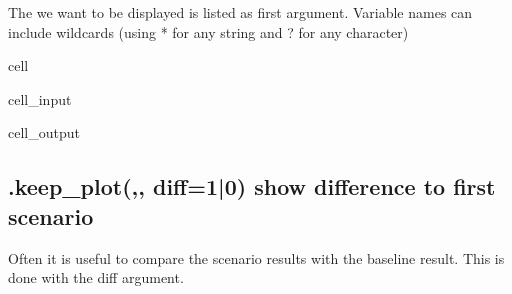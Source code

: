 \documentclass[letterpaper,10pt,english]{jupyterBook}
\begin{document}
\sphinxAtStartPar
The  we want to be displayed is listed as first argument. Variable names can include
wildcards (using * for any string and ? for any character)

\begin{sphinxuseclass}{cell}\begin{sphinxVerbatimInput}

\begin{sphinxuseclass}{cell_input}
\begin{sphinxVerbatim}[commandchars=\\\{\}]
   \PYG{p}{[}\PYG{p}{]}
       
\end{sphinxVerbatim}

\end{sphinxuseclass}\end{sphinxVerbatimInput}
\begin{sphinxVerbatimOutput}

\begin{sphinxuseclass}{cell_output}
\noindent{}

\noindent{}

\noindent{}

\end{sphinxuseclass}\end{sphinxVerbatimOutput}

\end{sphinxuseclass}

\subsection{.keep\_plot(,, diff=1|0) show difference to first scenario}
\label{\detokenize{content/howto/experiments/create_save_scenarios:keep-plot-diff-1-0-show-difference-to-first-scenario}}
\sphinxAtStartPar
Often it is useful to compare the scenario results with the baseline result. This is done with the diff argument.
\end{document}

